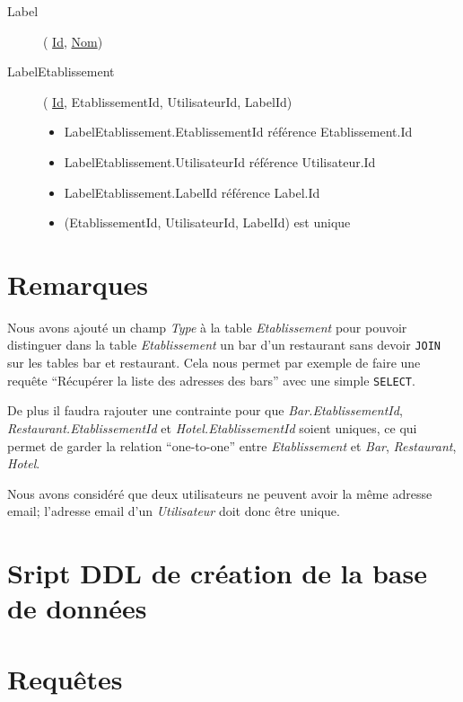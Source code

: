 \documentclass[10pt,a4paper]{article}
\begin{document}
\begin{description}
\item[Label](
    \underline{Id},
    \underline{Nom})

\item[LabelEtablissement](
    \underline{Id},
    EtablissementId,
    UtilisateurId,
    LabelId)

    \begin{itemize}
        \item LabelEtablissement.EtablissementId référence Etablissement.Id
        \item LabelEtablissement.UtilisateurId référence Utilisateur.Id
        \item LabelEtablissement.LabelId référence Label.Id
        \item (EtablissementId, UtilisateurId, LabelId) est unique
    \end{itemize}

\end{description}

\section{Remarques}

Nous avons ajouté un champ \textit{Type} à la table \textit{Etablissement} pour pouvoir distinguer dans la table \textit{Etablissement} un bar d'un restaurant sans devoir \texttt{JOIN} sur les tables bar et restaurant. Cela nous permet par exemple de faire une requête ``Récupérer la liste des adresses des bars'' avec une simple \texttt{SELECT}.

De plus il faudra rajouter une contrainte pour que \textit{Bar.EtablissementId}, \textit{Restaurant.EtablissementId} et \textit{Hotel.EtablissementId} soient uniques, ce qui permet de garder la relation ``one-to-one'' entre \textit{Etablissement} et \textit{Bar}, \textit{Restaurant}, \textit{Hotel}.

Nous avons considéré que deux utilisateurs ne peuvent avoir la même adresse email; l'adresse email d'un \textit{Utilisateur} doit donc être unique.


\section{Sript DDL de création de la base de données}


\section{Requêtes}

\end{document}
